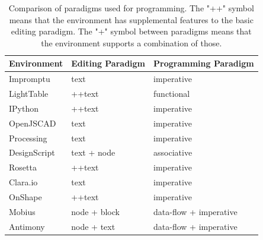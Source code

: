 \begin{table}
	\centering
	\renewcommand{\arraystretch}{1.2}

	\begin{tabulary}{\textwidth}{lLL}
		\toprule
		{\bf Environment} & {\bf Editing Paradigm} 		& {\bf Programming Paradigm}\\
		\midrule
		Impromptu			& text											& imperative								\\
		LightTable		& ++text										& functional 								\\
		IPython				& ++text										& imperative 								\\
		OpenJSCAD			& text											& imperative 								\\
		Processing		& text											& imperative								\\
		DesignScript	& text + node								& associative								\\
		Rosetta				& ++text										& imperative 								\\
		Clara.io			& text											& imperative								\\
		OnShape				& ++text										& imperative								\\
		Mobius				& node + block							& data-flow + imperative		\\
		Antimony			& node + text								& data-flow + imperative		\\
		\bottomrule
	\end{tabulary}

	\caption[Comparison of paradigms used for programming.]{Comparison of paradigms used for programming. The "++" symbol means that the environment has supplemental features to the basic editing paradigm. The "+" symbol between paradigms means that the environment supports a combination of those.}
	\label{table:edit:prog:paradigms}
\end{table}

